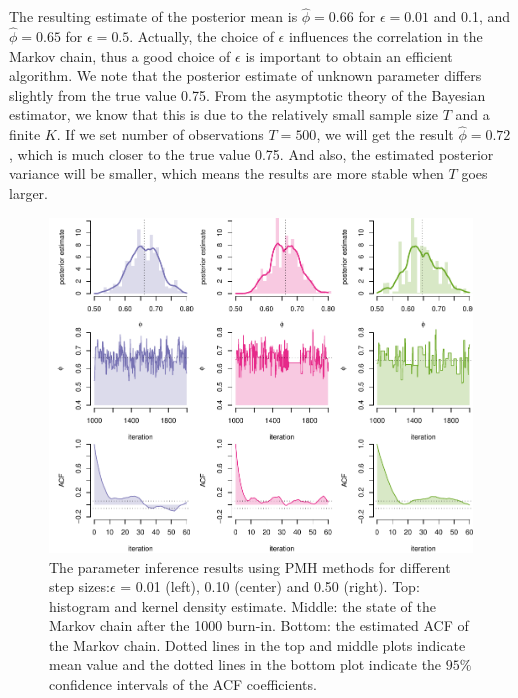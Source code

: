 \documentclass[mstat,12pt]{unswthesis}  %
\numberwithin{equation}{section}
\begin{document}
\noindent The resulting estimate of the posterior mean is
$\widehat{\phi}=0.66$ for $\epsilon=0.01$ and 0.1, and 
$\widehat{\phi}=0.65$ for $\epsilon=0.5$. Actually, the choice of $\epsilon$ influences the correlation
in the Markov chain, thus a good choice of $\epsilon$ is important to obtain an efficient algorithm. 
We note that the 
posterior estimate of unknown parameter differs slightly from the true value 0.75. From the asymptotic theory of the Bayesian estimator, we know that this is due to the
relatively small sample size $T$ and a finite $K$. If we 
set number of observations $T= 500$, we will get the result
$\widehat{\phi}=0.72$, which is much closer to the true value
0.75. And also, the estimated posterior variance will be smaller, which means the results are more stable when $T$ goes larger.



\begin{figure}[H]
    \centering
    \includegraphics[width=1.0\linewidth]{MyExample2.pdf}
    \caption
    {The parameter inference results using PMH methods for different step  sizes:$\epsilon$ = 0.01 (left), 0.10
    (center) and 0.50 (right). Top: histogram and kernel density estimate.
    Middle: the state of
    the Markov chain after the 1000 burn-in. 
    Bottom: the estimated ACF of the
    Markov chain.
    Dotted lines in the top and middle plots indicate
    mean value and the dotted lines in the bottom plot indicate the $95\%$ confidence intervals of the ACF
    coefficients.}
    \label{fig:mph_lgss}
\end{figure}
\end{document}
